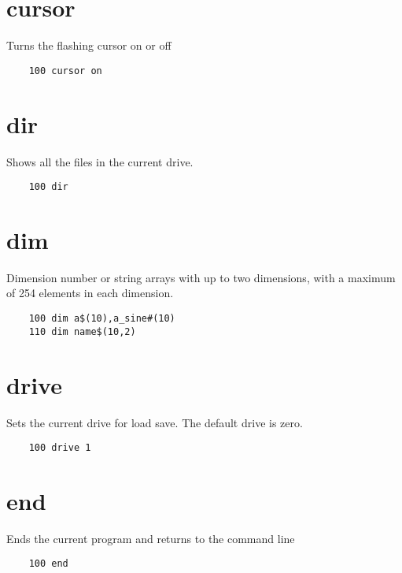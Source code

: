 \section*{cursor}
Turns the flashing cursor on or off
\example{}
\begin{verbatim}
	100 cursor on
\end{verbatim}

\section*{dir}
Shows all the files in the current drive.
\example{}
\begin{verbatim}
	100 dir
\end{verbatim}

\section*{dim}
Dimension number or string arrays with up to two dimensions, with a maximum of 254 elements in each dimension.
\example{}
\begin{verbatim}
	100 dim a$(10),a_sine#(10)
	110 dim name$(10,2)
\end{verbatim}

\section*{drive}
Sets the current drive for load save. The default drive is zero.
\example{}
\begin{verbatim}
	100 drive 1
\end{verbatim}

\section*{end}
Ends the current program and returns to the command line
\example{}
\begin{verbatim}
	100 end
\end{verbatim}

